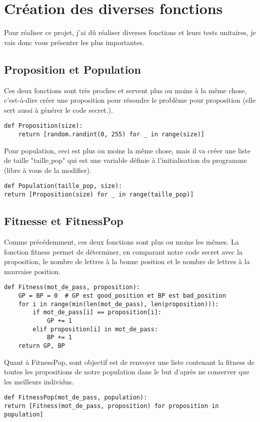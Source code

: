 \documentclass[french,12pt,a4paper]{report}
\begin{document}
\chapter{Création des diverses fonctions}

Pour réaliser ce projet, j'ai dû réaliser diverses fonctions et leurs tests unitaires, je vais donc vous présenter les plus importantes.


\section{Proposition et Population}

Ces deux fonctions sont très proches et servent plus ou moins à la même chose, c'est-à-dire créer une proposition pour résoudre le problème pour proposition (elle sert aussi à générer le code secret.).

\begin{lstlisting}[style=python]
def Proposition(size):
    return [random.randint(0, 255) for _ in range(size)]
\end{lstlisting}
\vspace{0.2cm}

Pour population, ceci est plus ou moins la même chose, mais il va créer une liste de taille "taille$\_$pop" qui est une variable définie à l'initialisation du programme (libre à vous de la modifier).
\begin{lstlisting}[style=python]
def Population(taille_pop, size):
return [Proposition(size) for _ in range(taille_pop)]
\end{lstlisting}
\vspace{0.2 cm}

\section{Fitnesse et FitnessPop}
\label{fitness}
Comme précédemment, ces deux fonctions sont plus ou moins les mêmes. La fonction fitness permet de déterminer, en comparant notre code secret avec la proposition, le nombre de lettres à la bonne position et le nombre de lettres à la mauvaise position.
\begin{lstlisting}[style = python]
def Fitness(mot_de_pass, proposition):
    GP = BP = 0  # GP est good_position et BP est bad_position
    for i in range(min(len(mot_de_pass), len(proposition))):
        if mot_de_pass[i] == proposition[i]:
            GP += 1
        elif proposition[i] in mot_de_pass:
            BP += 1
    return GP, BP
\end{lstlisting}
\vspace{0.2cm}
Quant à FitnessPop, sont objectif est de renvoyer une liste contenant la fitness de toutes les propositions de notre population dans le but d'après ne conserver que les meilleurs individus.
\begin{lstlisting}[style = python]
def FitnessPop(mot_de_pass, population):
return [Fitness(mot_de_pass, proposition) for proposition in population]
\end{lstlisting}
\end{document}

